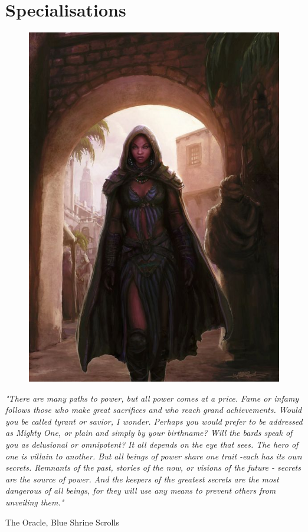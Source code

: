 





%

%



%




%


%



\chapter{Specialisations}\label{chap:specs}

\begin{figure}[!htb]
\centering
\includegraphics[width=0.6\linewidth]{images/agent.jpg}
\end{figure}

\epigraph{\textit{
"There are many paths to power, but all power comes at a price. Fame or infamy follows those who make great sacrifices
and who reach grand achievements. Would you be called tyrant or savior, I wonder. Perhaps you would prefer to be
addressed as Mighty One, or plain and simply by your birthname? Will the bards speak of you as delusional or
omnipotent? It all depends on the eye that sees. The hero of one is villain to another. But all beings of power share one
trait -each has its own secrets. Remnants of the past, stories of the now, or visions of the future - secrets are the source of
power. And the keepers of the greatest secrets are the most dangerous of all beings, for they will use any means to prevent
others from unveiling them." } } { The Oracle, Blue Shrine Scrolls }

